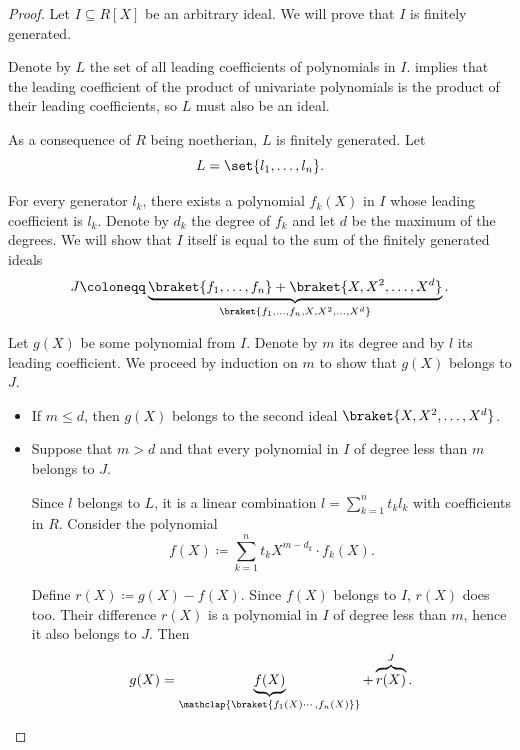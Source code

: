 \begin{proof}
  Let \( I \subseteq R[X] \) be an arbitrary ideal. We will prove that \( I \) is finitely generated.

  Denote by \( L \) the set of all leading coefficients of polynomials in \( I \).  implies that the leading coefficient of the product of univariate polynomials is the product of their leading coefficients, so \( L \) must also be an ideal.

  As a consequence of \( R \) being noetherian, \( L \) is finitely generated. Let
  \begin{equation*}
    L = \set{ l_1, \ldots, l_n }.
  \end{equation*}

  For every generator \( l_k \), there exists a polynomial \( f_k(X) \) in \( I \) whose leading coefficient is \( l_k \). Denote by \( d_k \) the degree of \( f_k \) and let \( d \) be the maximum of the degrees. We will show that \( I \) itself is equal to the sum of the finitely generated ideals
  \begin{equation*}
    J \coloneqq \underbrace{ \braket{ f_1, \ldots, f_n } + \braket{ X, X^2, \ldots, X^d } }_{ \braket{ f_1, \ldots, f_n, X, X^2, \ldots, X^d } }.
  \end{equation*}

  Let \( g(X) \) be some polynomial from \( I \). Denote by \( m \) its degree and by \( l \) its leading coefficient. We proceed by induction on \( m \) to show that \( g(X) \) belongs to \( J \).
  \begin{itemize}
    \item If \( m \leq d \), then \( g(X) \) belongs to the second ideal \( \braket{ X, X^2, \ldots, X^d } \).

    \item Suppose that \( m > d \) and that every polynomial in \( I \) of degree less than \( m \) belongs to \( J \).

    Since \( l \) belongs to \( L \), it is a linear combination \( l = \sum_{k=1}^n t_k l_k \) with coefficients in \( R \). Consider the polynomial
    \begin{equation*}
      f(X) \coloneqq \sum_{k=1}^n t_k X^{m - d_k} \cdot f_k(X).
    \end{equation*}

    Define \( r(X) \coloneqq g(X) - f(X) \). Since \( f(X) \) belongs to \( I \), \( r(X) \) does too. Their difference \( r(X) \) is a polynomial in \( I \) of degree less than \( m \), hence it also belongs to \( J \). Then
    \begin{equation*}
      g(X) = \underbrace{ f(X) }_{\mathclap{\braket{ f_1(X) \cdots, f_n(X) }}} + \overbrace{ r(X) }^J.
    \end{equation*}


\end{itemize}
\end{proof}
